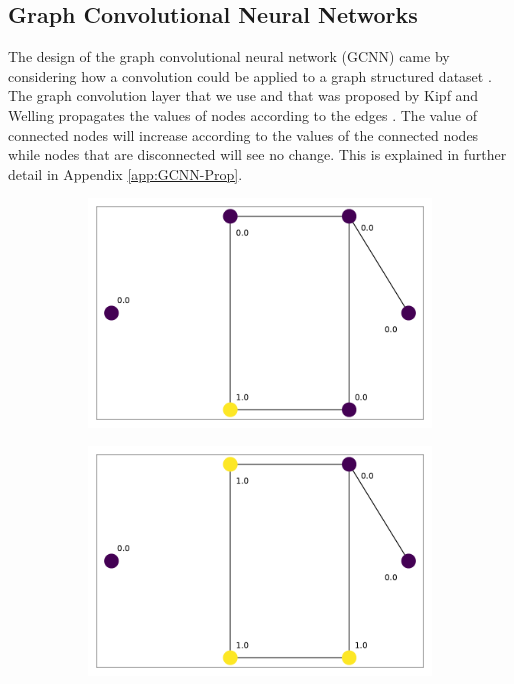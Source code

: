 \documentclass[../thesis.tex]{subfiles}
\begin{document}
\subsection{Graph Convolutional Neural Networks}\label{subsec:GCNN}
The design of the graph convolutional neural network (GCNN) came by considering how a convolution could be applied to a graph structured dataset \cite{GCNN_Kipf}.
The graph convolution layer that we use and that was proposed by Kipf and Welling propagates the values of nodes according to the edges \cite{GCNN_Kipf}.
The value of connected nodes will increase according to the values of the connected nodes while nodes that are disconnected will see no change.
This is explained in further detail in Appendix \ref{app:GCNN-Prop}.
\begin{figure}[t]
	\centering
	\begin{subfigure}{0.45\textwidth}
		\includegraphics[width=\textwidth]{figures/graph_signal-00.pdf}
		\caption{}
		\label{fig:prop-ex-0}
	\end{subfigure}
	\begin{subfigure}{0.45\textwidth}
		\includegraphics[width=\textwidth]{figures/graph_signal-01.pdf}

\end{subfigure}
\end{figure}
\end{document}
